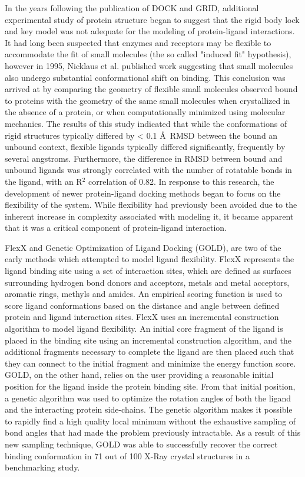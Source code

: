 In the years following the publication of DOCK and GRID, additional experimental study of protein structure began to suggest that the rigid body lock and key model was not adequate for the modeling of protein-ligand interactions.
It had long been suspected\citep{KOSHLAND:1958wa} that enzymes and receptors may be flexible to accommodate the fit of small molecules (the so called "induced fit" hypothesis), however in 1995, Nicklaus et al.\citep{Nicklaus:1995tu} published work suggesting that small molecules also undergo substantial conformational shift on binding.
This conclusion was arrived at by comparing the geometry of flexible small molecules observed bound to proteins with the geometry of the same small molecules when crystallized in the absence of a protein, or when computationally minimized using molecular mechanics.
The results of this study indicated that while the conformations of rigid structures typically differed by < 0.1 \AA\ RMSD between the bound an unbound context, flexible ligands typically differed significantly, frequently by several angstroms.
Furthermore, the difference in RMSD between bound and unbound ligands was strongly correlated with the number of rotatable bonds in the ligand, with an R$^{2}$ correlation of 0.82.
In response to this research, the development of newer protein-ligand docking methods began to focus on the flexibility of the system.
While flexibility had previously been avoided due to the inherent increase in complexity associated with modeling it, it became apparent that it was a critical component of protein-ligand interaction.

FlexX\citep{Rarey:1996hf} and Genetic Optimization of Ligand Docking (GOLD)\citep{Jones:1997bl}, are two of the early methods which attempted to model ligand flexibility.
FlexX represents the ligand binding site using a set of interaction sites, which are defined as surfaces surrounding hydrogen bond donors and acceptors, metals and metal acceptors, aromatic rings, methyls and amides.
An empirical scoring function is used to score ligand conformations based on the distance and angle between defined protein and ligand interaction sites.
FlexX uses an incremental construction algorithm to model ligand flexibility.
An initial core fragment of the ligand is placed in the binding site using an incremental construction algorithm, and the additional fragments necessary to complete the ligand are then placed such that they can connect to the initial fragment and minimize the energy function score. 
GOLD, on the other hand, relies on the user providing a reasonable initial position for the ligand inside the protein binding site.
From that initial position, a genetic algorithm\citep{Jones:1995vw} was used to optimize the rotation angles of both the ligand and the interacting protein side-chains. 
The genetic algorithm makes it possible to rapidly find a high quality local minimum without the exhaustive sampling of bond angles that had made the problem previously intractable.
As a result of this new sampling technique, GOLD was able to successfully recover the correct binding conformation in 71 out of 100 X-Ray crystal structures in a benchmarking study. 


